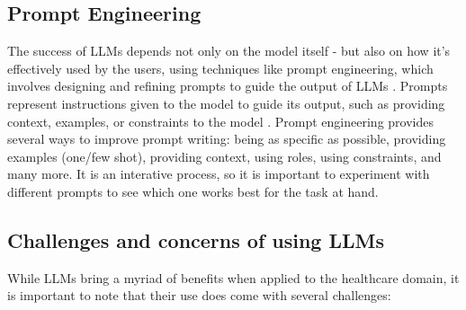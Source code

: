 \subsection{Prompt Engineering}

The success of LLMs depends not only on the model itself - but also on how it's effectively used by the users, using techniques like prompt engineering, which involves designing and refining prompts to guide the output of LLMs \parencite{promptmed}. Prompts represent instructions given to the model to guide its output, such as providing context, examples, or constraints to the model \parencite{prompt}. Prompt engineering provides several ways to improve prompt writing: being as specific as possible, providing examples (one/few shot), providing context, using roles, using constraints, and many more. It is an interative process, so it is important to experiment with different prompts to see which one works best for the task at hand.


\subsection{Challenges and concerns of using LLMs}

While LLMs bring a myriad of benefits when applied to the healthcare domain, it is important to note that their use does come with several challenges:

